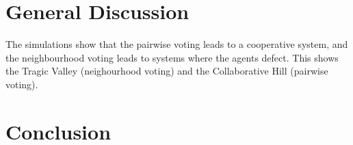 \documentclass[]{llncs} %
\begin{document}
\section{General Discussion}
\label{sec:general_discussion}
The simulations show that the pairwise voting leads to a cooperative system,
and the neighbourhood voting leads to systems where the agents defect.  This
shows the Tragic Valley (neighourhood voting) and the Collaborative Hill
(pairwise voting).  


\section{Conclusion}
\label{sec:conclusion}




\begin{subappendices} %
\label{app:original_results}


\end{subappendices}
\end{document}
